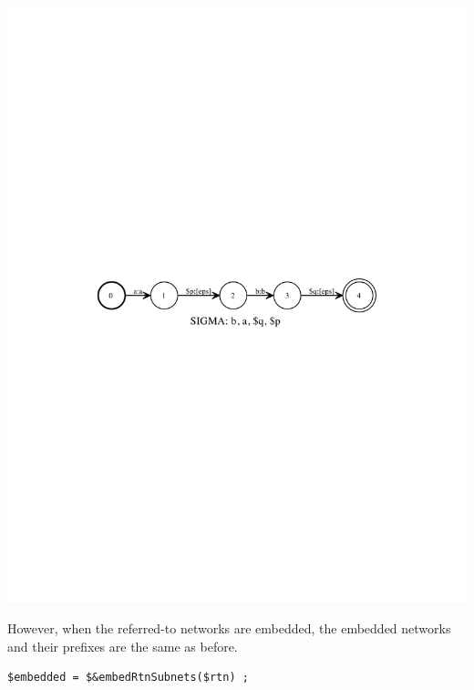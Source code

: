 \documentclass[letterpaper,12pt]{article}
\begin{document}
\begin{center}
\includegraphics[width=\textwidth]{images/sapEpsTwoReferences.pdf}
\end{center}

However, when the referred-to networks are embedded, the embedded networks and their
prefixes are the same as before.

\begin{Verbatim}[fontsize=\small]
$embedded = $&embedRtnSubnets($rtn) ;
\end{Verbatim}
\end{document}
